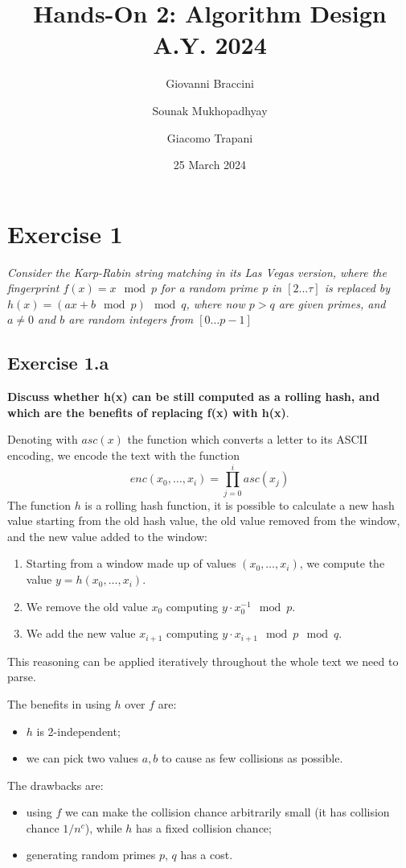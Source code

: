 \documentclass{article}
\title{Hands-On 2: Algorithm Design A.Y. 2024}
\author{Giovanni Braccini \and Sounak Mukhopadhyay \and Giacomo Trapani}
\date{25 March 2024}
\begin{document}
\maketitle

\section{Exercise 1}
{\itshape
Consider the Karp-Rabin string matching in its Las Vegas version, where the fingerprint \(f(x) = x \mod p\) for a random prime p in \([2...\tau]\)
is replaced by \(h(x) = (a x + b \mod p) \mod q\), where now \(p  > q\) are given primes,
and \(a \neq 0\) and \(b\) are random integers from \([0... p-1]\)}
\subsection*{Exercise 1.a}
\textbf{Discuss whether h(x) can be still computed as a rolling hash, and which are the benefits of replacing f(x) with h(x)}.

Denoting with \(asc(x)\) the function which converts a letter to its ASCII encoding, we encode the text with the
function \[enc(x_0, \dots, x_i) = \prod_{j=0}^i asc(x_j)\]
The function \(h\) is a rolling hash function, it is possible to calculate a new hash value
starting from the old hash value, the old value removed from the window, and the new value added to the window:
\begin{enumerate}
	\item Starting from a window made up of values \((x_0, \dots, x_i)\), we compute the
	value \(y = h(x_0, \dots, x_i)\).
	\item We remove the old value \(x_0\) computing \(y \cdot x_0^{-1} \mod p\).
	\item We add the new value \(x_{i+1}\) computing \(y \cdot x_{i+1} \mod p \mod q\).
\end{enumerate}
This reasoning can be applied iteratively throughout the whole text we need to parse.

The benefits in using \(h\) over \(f\) are:
\begin{itemize}
	\item \(h\) is 2-independent;
	\item we can pick two values \(a, b\) to cause as few collisions as possible.
\end{itemize}
The drawbacks are:
\begin{itemize}
	\item using \(f\) we can make the collision chance arbitrarily small (it has collision
	chance \(1/n^c\)), while \(h\) has a fixed collision chance;
	\item generating random primes \(p\), \(q\) has a cost.
\end{itemize}
\end{document}
